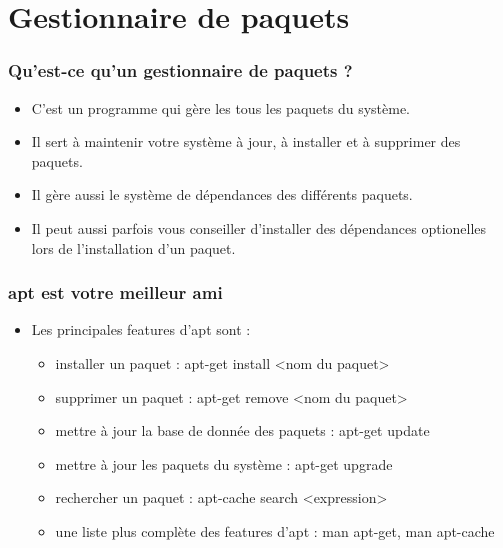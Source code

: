 \section{Gestionnaire de paquets}
\begin{frame}
    \frametitle{Qu'est-ce qu'un gestionnaire de paquets ?}
    \begin{itemize}
        \item<1 -> C'est un programme qui gère les tous les paquets du système.
        \item<2 -> Il sert à maintenir votre système à jour, à installer et à
        supprimer des paquets.
        \item<3 -> Il gère aussi le système de dépendances des différents
        paquets.
        \item<4 -> Il peut aussi parfois vous conseiller d'installer des
        dépendances optionelles lors de l'installation d'un paquet.
    \end{itemize}
\end{frame}
\begin{frame}
    \frametitle{apt est votre meilleur ami}
    \begin{itemize}
        \item Les principales features d'apt sont :
        \begin{itemize}
            \item<1 -> installer un paquet : apt-get install <nom du paquet>
            \item<2 -> supprimer un paquet : apt-get remove <nom du paquet>
            \item<3 -> mettre à jour la base de donnée des paquets : apt-get update
            \item<4 -> mettre à jour les paquets du système : apt-get upgrade
            \item<5 -> rechercher un paquet : apt-cache search <expression>
            \item<6 -> une liste plus complète des features d'apt : man apt-get, man apt-cache
        \end{itemize}
    \end{itemize}
\end{frame}
